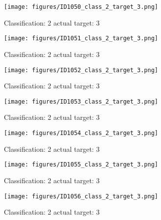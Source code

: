 \begin{figure}[h!]
\begin{center}
\texttt{[image: figures/ID1050\_class\_2\_target\_3.png]}
\end{center}
\caption{ Classification: 2 actual target: 3}
\label{fig:ID1050_class_2_target_3}
\end{figure}
\begin{figure}[h!]
\begin{center}
\texttt{[image: figures/ID1051\_class\_2\_target\_3.png]}
\end{center}
\caption{ Classification: 2 actual target: 3}
\label{fig:ID1051_class_2_target_3}
\end{figure}
\begin{figure}[h!]
\begin{center}
\texttt{[image: figures/ID1052\_class\_2\_target\_3.png]}
\end{center}
\caption{ Classification: 2 actual target: 3}
\label{fig:ID1052_class_2_target_3}
\end{figure}
\begin{figure}[h!]
\begin{center}
\texttt{[image: figures/ID1053\_class\_2\_target\_3.png]}
\end{center}
\caption{ Classification: 2 actual target: 3}
\label{fig:ID1053_class_2_target_3}
\end{figure}
\begin{figure}[h!]
\begin{center}
\texttt{[image: figures/ID1054\_class\_2\_target\_3.png]}
\end{center}
\caption{ Classification: 2 actual target: 3}
\label{fig:ID1054_class_2_target_3}
\end{figure}
\begin{figure}[h!]
\begin{center}
\texttt{[image: figures/ID1055\_class\_2\_target\_3.png]}
\end{center}
\caption{ Classification: 2 actual target: 3}
\label{fig:ID1055_class_2_target_3}
\end{figure}
\begin{figure}[h!]
\begin{center}
\texttt{[image: figures/ID1056\_class\_2\_target\_3.png]}
\end{center}
\caption{ Classification: 2 actual target: 3}
\label{fig:ID1056_class_2_target_3}
\end{figure}
